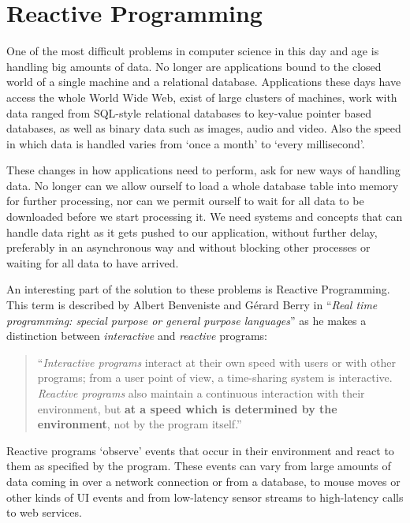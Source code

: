 \section{Reactive Programming}
\label{sec:reactive-programming}
One of the most difficult problems in computer science in this day and age is handling big amounts of data. No longer are applications bound to the closed world of a single machine and a relational database. Applications these days have access the whole World Wide Web, exist of large clusters of machines, work with data ranged from SQL-style relational databases to key-value pointer based databases, as well as binary data such as images, audio and video. Also the speed in which data is handled varies from `once a month' to `every millisecond'.

These changes in how applications need to perform, ask for new ways of handling data. No longer can we allow ourself to load a whole database table into memory for further processing, nor can we permit ourself to wait for all data to be downloaded before we start processing it. We need systems and concepts that can handle data right as it gets pushed to our application, without further delay, preferably in an asynchronous way and without blocking other processes or waiting for all data to have arrived. \cite{meijer2012-YMIAD}

An interesting part of the solution to these problems is Reactive Programming. This term is described by Albert Benveniste and G\'erard Berry in ``\textit{Real time programming: special purpose or general purpose languages}'' \cite{berry1991-Reactive} as he makes a distinction between \textit{interactive} and \textit{reactive} programs:

\begin{quote}
``\textit{Interactive programs} interact at their own speed with users or with other programs; from a user point of view, a time-sharing system is interactive. \textit{Reactive programs} also maintain a continuous interaction with their environment, but \textbf{at a speed which is determined by the environment}, not by the program itself.''
\end{quote}

Reactive programs `observe' events that occur in their environment and react to them as specified by the program. These events can vary from large amounts of data coming in over a network connection or from a database, to mouse moves or other kinds of UI events and from low-latency sensor streams to high-latency calls to web services.

